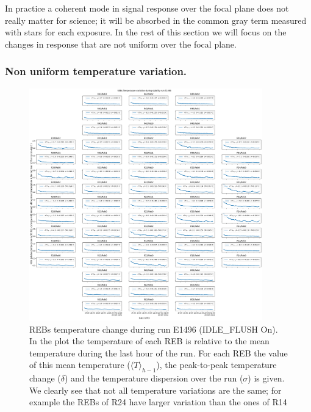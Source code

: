 In practice a coherent mode in signal response over the focal plane does not really matter for science; it will be absorbed in the common gray term measured with stars for each exposure. In the rest of this section we will focus on the changes in response that are not uniform over the focal plane. 

\subsubsection{Non uniform temperature variation.} 

\begin{figure}[ht]
\begin{centering}
\includegraphics[width=0.9\textwidth]{figures/FocalPlanTempRun_E1496.png}
\end{centering}
\caption{REBs temperature change during run E1496 (IDLE\_FLUSH On). In the plot the temperature of each REB is relative to the mean temperature during the last hour of the run. For each REB the value of this mean temperature ($\langle T \rangle_{h-1}$), the peak-to-peak temperature change ($\delta$) and the temperature dispersion over the run ($\sigma$) is given. We clearly see that not all temperature variations are the same; for example the REBs of R24 have larger variation than the ones of R14}   
\label{fig:tempE1496}
\end{figure}
